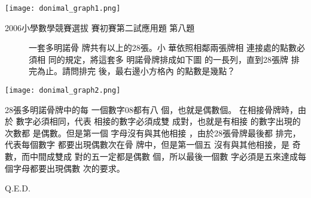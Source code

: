 \documentclass{article}
\begin{document}
\begin{center}
\texttt{[image: donimal\_graph1.png]}
\end{center}%

\begin{description}
\item[2006小學數學競賽選拔%
賽初賽第二試應用題%
第八題] 一套多明諾骨%
牌共有以上的28張。小%
華依照相鄰兩張牌相%
連接處的點數必須相%
同的規定，將這套多%
明諾骨牌排成如下圖%
的一長列，直到28張牌%
排完為止。請問排完%
後，最右邊小方格內%
的點數是幾點？
\end{description}

\begin{center}
\texttt{[image: donimal\_graph2.png]}
\end{center}%

\bigskip 

28張多明諾骨牌中的每%
一個數字08都有八%
個，也就是偶數個。%
在相接骨牌時，由於%
數字必須相同，代表%
相接的數字必須成雙%
成對，也就是有相接%
的數字出現的次數都%
是偶數。但是第一個%
字母沒有與其他相接%
，由於28張骨牌最後都%
排完，代表每個數字%
都要出現偶數次在骨%
牌中，但是第一個五%
沒有與其他相接，是%
奇數，而中間成雙成%
對的五一定都是偶數%
個，所以最後一個數%
字必須是五來達成每%
個字母都要出現偶數%
次的要求。

Q.E.D.

\end{document}
